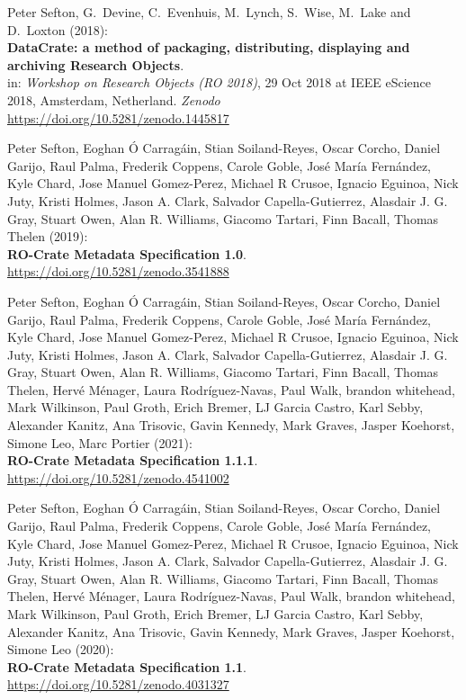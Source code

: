 \begin{thebibliography}{9}
Peter Sefton, G.~Devine, C.~Evenhuis, M.~Lynch, S.~Wise,
M.~Lake and D.~Loxton (2018):\\
\textbf{DataCrate: a method of packaging, distributing, displaying and
archiving Research Objects}.\\
in: \emph{Workshop on Research Objects (RO 2018)}, 29 Oct 2018 at IEEE
eScience 2018, Amsterdam, Netherland. \emph{Zenodo}\\
\url{https://doi.org/10.5281/zenodo.1445817}


Peter Sefton, Eoghan Ó Carragáin, Stian Soiland-Reyes, Oscar
Corcho, Daniel Garijo, Raul Palma, Frederik Coppens, Carole Goble, José
María Fernández, Kyle Chard, Jose Manuel Gomez-Perez, Michael R Crusoe,
Ignacio Eguinoa, Nick Juty, Kristi Holmes, Jason A. Clark, Salvador
Capella-Gutierrez, Alasdair J. G. Gray, Stuart Owen, Alan R. Williams,
Giacomo Tartari, Finn Bacall, Thomas Thelen (2019):\\
\textbf{RO-Crate Metadata Specification 1.0}.\\
\url{https://doi.org/10.5281/zenodo.3541888}

Peter Sefton, Eoghan Ó Carragáin, Stian Soiland-Reyes, Oscar
Corcho, Daniel Garijo, Raul Palma, Frederik Coppens, Carole Goble, José
María Fernández, Kyle Chard, Jose Manuel Gomez-Perez, Michael R Crusoe,
Ignacio Eguinoa, Nick Juty, Kristi Holmes, Jason A. Clark, Salvador
Capella-Gutierrez, Alasdair J. G. Gray, Stuart Owen, Alan R. Williams,
Giacomo Tartari, Finn Bacall, Thomas Thelen, Hervé Ménager, Laura
Rodríguez-Navas, Paul Walk, brandon whitehead, Mark Wilkinson, Paul
Groth, Erich Bremer, LJ Garcia Castro, Karl Sebby, Alexander Kanitz, Ana
Trisovic, Gavin Kennedy, Mark Graves, Jasper Koehorst, Simone Leo, Marc
Portier (2021):\\
\textbf{RO-Crate Metadata Specification 1.1.1}.\\
\url{https://doi.org/10.5281/zenodo.4541002}

Peter Sefton, Eoghan Ó Carragáin, Stian Soiland-Reyes, Oscar
Corcho, Daniel Garijo, Raul Palma, Frederik Coppens, Carole Goble, José
María Fernández, Kyle Chard, Jose Manuel Gomez-Perez, Michael R Crusoe,
Ignacio Eguinoa, Nick Juty, Kristi Holmes, Jason A. Clark, Salvador
Capella-Gutierrez, Alasdair J. G. Gray, Stuart Owen, Alan R. Williams,
Giacomo Tartari, Finn Bacall, Thomas Thelen, Hervé Ménager, Laura
Rodríguez-Navas, Paul Walk, brandon whitehead, Mark Wilkinson, Paul
Groth, Erich Bremer, LJ Garcia Castro, Karl Sebby, Alexander Kanitz, Ana
Trisovic, Gavin Kennedy, Mark Graves, Jasper Koehorst, Simone Leo
(2020):\\
\textbf{RO-Crate Metadata Specification 1.1}.\\
\url{https://doi.org/10.5281/zenodo.4031327}


\end{thebibliography}
